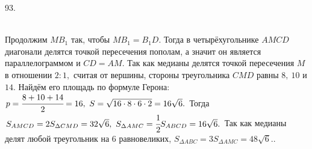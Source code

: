 \documentclass[12pt]{article}
\begin{document}
93. \begin{figure}[ht!]
\end{figure}\\
Продолжим $MB_1$ так, чтобы $MB_1=B_1D.$ Тогда в четырёхугольнике $AMCD$ диагонали делятся точкой пересечения пополам, а значит он является параллелограммом и $CD=AM.$ Так как медианы делятся точкой пересечения $M$ в отношении $2:1,$ считая от вершины, стороны треугольника $CMD$ равны $8,\ 10$ и $14.$ Найдём его площадь по формуле Герона: $p=\cfrac{8+10+14}{2}=16,\ S=\sqrt{16\cdot8\cdot6\cdot2}=16\sqrt{6}.$ Тогда $S_{AMCD}=2S_{\Delta CMD}=32\sqrt{6},\ S_{\Delta AMC}=\cfrac{1}{2}S_{ABCD}=16\sqrt{6}.$ Так как медианы делят любой треугольник на 6 равновеликих, $S_{\Delta ABC}=3S_{\Delta AMC}=48\sqrt{6}.$\newpage{}. \begin{figure}[ht!]
\end{figure}\\
\end{document}
